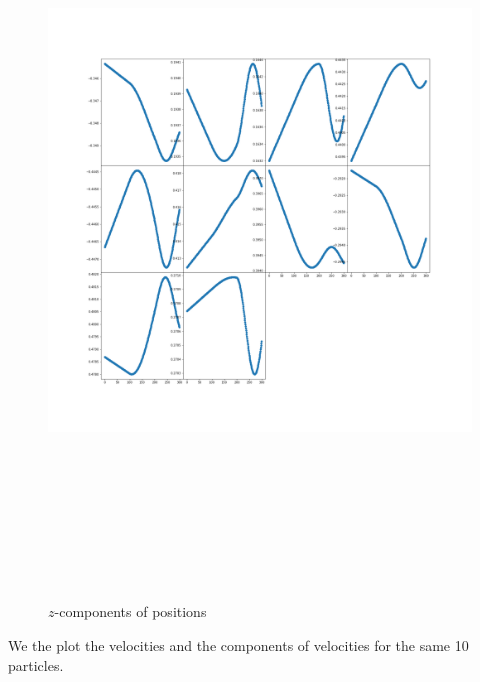 \documentclass[12pt]{article}
\begin{document}
	\begin{figure}[H]
		\includegraphics[width=\linewidth, height=20cm]{subpsz3.png} \caption{$z$-components of positions} \label{subpsz3}
	\end{figure}
	We the plot the velocities and the components of velocities for the same 10 particles.
\end{document}
